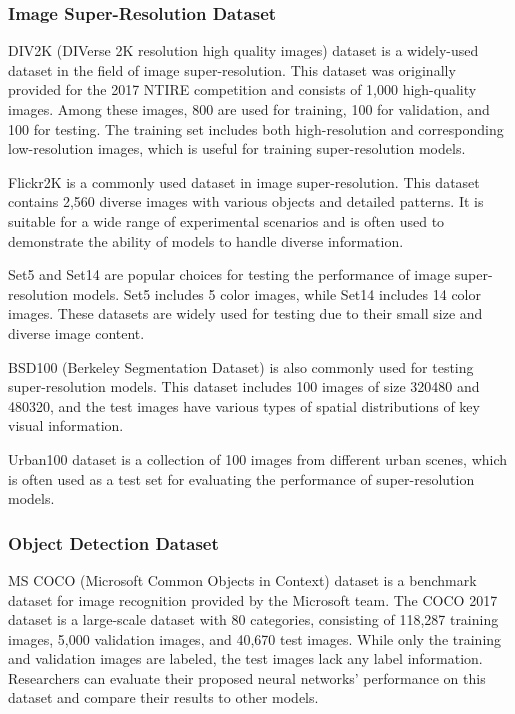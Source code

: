 \documentclass[default,iicol]{sn-jnl}
\theoremstyle{thmstyleone}\newtheorem{theorem}{Theorem}\newtheorem{proposition}[theorem]{Proposition}
\theoremstyle{thmstyletwo}\newtheorem{example}{Example}\newtheorem{remark}{Remark}\theoremstyle{thmstylethree}\newtheorem{definition}{Definition}
\begin{document}
\subsubsection{Image Super-Resolution Dataset}
DIV2K (DIVerse 2K resolution high quality images) dataset \cite{Ignatov2018} is a widely-used dataset in the field of image super-resolution. This dataset was originally provided for the 2017 NTIRE competition and consists of 1,000 high-quality images. Among these images, 800 are used for training, 100 for validation, and 100 for testing. The training set includes both high-resolution and corresponding low-resolution images, which is useful for training super-resolution models.

Flickr2K \cite{timofte2017ntire} is a commonly used dataset in image super-resolution. This dataset contains 2,560 diverse images with various objects and detailed patterns. It is suitable for a wide range of experimental scenarios and is often used to demonstrate the ability of models to handle diverse information.

Set5 \cite{bevilacqua2012low} and Set14 \cite{zeyde2012single} are popular choices for testing the performance of image super-resolution models. Set5 includes 5 color images, while Set14 includes 14 color images. These datasets are widely used for testing due to their small size and diverse image content.

BSD100 (Berkeley Segmentation Dataset) \cite{martin2001database} is also commonly used for testing super-resolution models. This dataset includes 100 images of size 320480 and 480320, and the test images have various types of spatial distributions of key visual information.

Urban100 dataset \cite{huang2015single} is a collection of 100 images from different urban scenes, which is often used as a test set for evaluating the performance of super-resolution models.

\subsubsection{Object Detection Dataset}
MS COCO (Microsoft Common Objects in Context) dataset \cite{lin2014microsoft} is a benchmark dataset for image recognition provided by the Microsoft team. The COCO 2017 dataset is a large-scale dataset with 80 categories, consisting of 118,287 training images, 5,000 validation images, and 40,670 test images. While only the training and validation images are labeled, the test images lack any label information. Researchers can evaluate their proposed neural networks' performance on this dataset and compare their results to other models.
\end{document}
